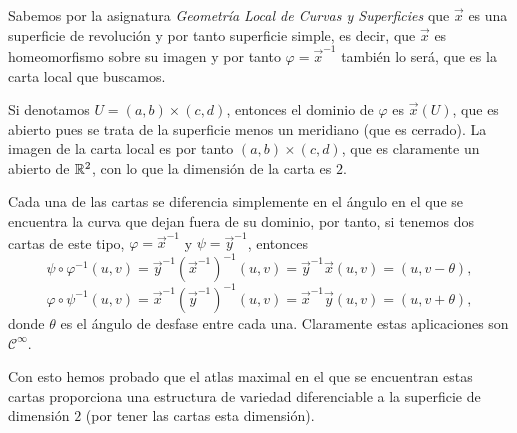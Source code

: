 \documentclass[twoside]{article}
\begin{document}
\begin{solucion}
Sabemos por la asignatura \emph{ Geometría Local de Curvas y Superficies} que $\vec{x}$ es una superficie de revolución y por tanto superficie simple, es decir, que $\vec{x}$ es homeomorfismo sobre su imagen y por tanto $\varphi=\vec{x}^{-1}$ también lo será, que es la carta local que buscamos. 

Si denotamos $U=(a,b)\times(c,d)$, entonces el dominio de $\varphi$ es $\vec{x}(U)$, que es abierto pues se trata de la superficie menos un meridiano (que es cerrado). La imagen de la carta local es por tanto $(a,b)\times(c,d)$, que es claramente un abierto de $\mathbb{R}^2$, con lo que la dimensión de la carta es $2$. 


Cada una de las cartas se diferencia simplemente en el ángulo en el que se encuentra la curva que dejan fuera de su dominio, por tanto, si tenemos dos cartas de este tipo, $\varphi=\vec{x}^{-1}$ y $\psi=\vec{y}^{-1}$, entonces
$$\psi\circ\varphi^{-1}(u,v)=\vec{y}^{-1}(\vec{x}^{-1})^{-1}(u,v)=\vec{y}^{-1}\vec{x}(u,v)=(u,v-\theta),$$
$$\varphi\circ\psi^{-1}(u,v)=\vec{x}^{-1}(\vec{y}^{-1})^{-1}(u,v)=\vec{x}^{-1}\vec{y}(u,v)=(u,v+\theta),$$   
donde $\theta$ es el ángulo de desfase entre cada una. Claramente estas aplicaciones son $\mathcal{C}^\infty$. 

Con esto hemos probado que el atlas maximal en el que se encuentran estas cartas proporciona una estructura de variedad diferenciable a la superficie de dimensión $2$ (por tener las cartas esta dimensión).


\end{solucion}
\end{document}
